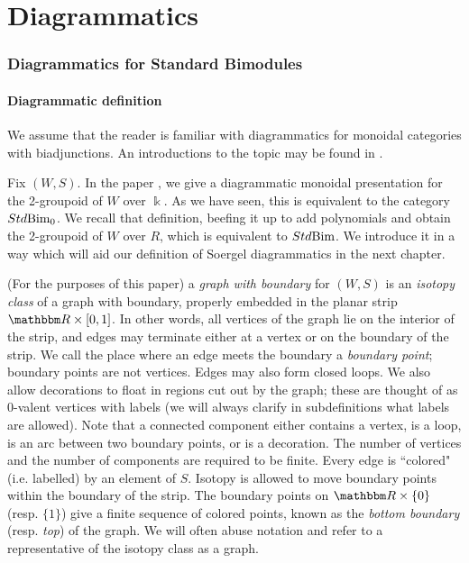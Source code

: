 \part{Diagrammatics}

\label{pt:diagrammatics}

\section{Diagrammatics for Standard Bimodules}
\label{sec-diagstd}

\subsection{Diagrammatic definition}
\label{subsec-StdDiagDef}

We assume that the reader is familiar with diagrammatics for monoidal categories with biadjunctions. An introductions to the topic may be found in \cite{Lauda}.

Fix $(W,S)$. In the paper \cite{EWFenn}, we give a diagrammatic monoidal presentation for the 2-groupoid of $W$ over $\Bbbk$. As we have seen, this is equivalent to the category $Std\textrm{Bim}_0$. We recall that definition, beefing it up to add polynomials and obtain the 2-groupoid of $W$ over $R$, which is equivalent to $Std\textrm{Bim}$. We introduce it in a way which will aid our definition of Soergel diagrammatics in the next chapter.

\begin{defn} \label{defn: graph}(For the purposes of this paper) a \emph{graph with boundary} for $(W,S)$ is an \emph{isotopy class} of a graph with boundary, properly embedded in the planar strip $\R
\times [0,1]$. In other words, all vertices of the graph lie on the interior of the strip, and edges may terminate either at a vertex or on the boundary of the strip. We call the place
where an edge meets the boundary a \emph{boundary point}; boundary points are not vertices. Edges may also form closed loops. We also allow decorations to float in regions cut out by the graph;
these are thought of as 0-valent vertices with labels (we will always clarify in subdefinitions what labels are allowed). Note that a connected component either contains a vertex, is a
loop, is an arc between two boundary points, or is a decoration.
The number of vertices and the number of components are required to be finite. Every edge is ``colored" (i.e. labelled) by
an element of $S$. Isotopy is allowed to move boundary points within the boundary of the strip. The boundary points on $\R \times \{0\}$ (resp. $\{1\}$) give a finite sequence of colored
points, known as the \emph{bottom boundary} (resp. \emph{top}) of the graph. We will often abuse notation and refer to a representative of the isotopy class as a graph. \end{defn}

